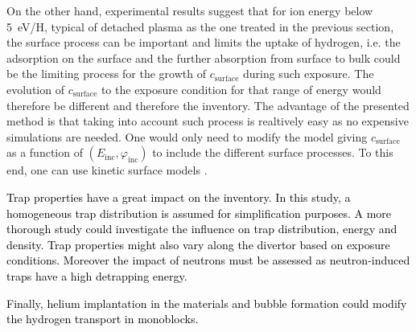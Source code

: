 On the other hand, experimental results \cite{t_hoen_strongly_2013} suggest that for ion energy below \SI{5}{eV/H}, typical of detached plasma as the one treated in the previous section, the surface process can be important and limits the uptake of hydrogen, i.e. the adsorption on the surface and the further absorption from surface to bulk could be the limiting process for the growth of $c_\mathrm{surface}$ during such exposure.
The evolution of $c_\mathrm{surface}$ to the exposure condition for that range of energy would therefore be different and therefore the inventory.
The advantage of the presented method is that taking into account such process is realtively easy as no expensive simulations are needed.
One would only need to modify the model giving $c_\mathrm{surface}$
as a function of $(E_\mathrm{inc},\varphi_\mathrm{inc})$ to include the different surface processes.
To this end, one can use kinetic surface models \cite{hodille_retention_2017, zaloznik_deuterium_2017, pecovnik_influence_2019, guterl_effects_2019}.

\textcolor{black}{
Trap properties have a great impact on the inventory.
In this study, a homogeneous trap distribution is assumed for simplification purposes.
A more thorough study could investigate the influence on trap distribution, energy and density.
Trap properties might also vary along the divertor based on exposure conditions.
Moreover the impact of neutrons must be assessed as neutron-induced traps have a high detrapping energy.
}

\textcolor{black}{
Finally, helium implantation in the materials and bubble formation could modify the hydrogen transport in monoblocks.
}
